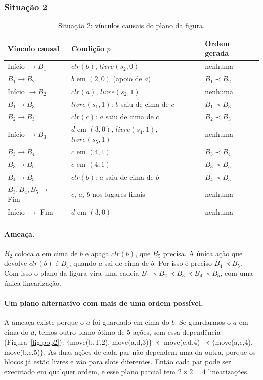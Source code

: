 \documentclass[11pt,a4paper]{article}
\newcommand{\clr}{\mathit{clr}}
\newcommand{\livre}{\mathit{livre}}
\begin{document}
\subsubsection{Situação 2}
\begin{table}[H]
\centering\small
\begin{tabular}{@{}lll@{}}
\toprule
Vínculo causal & Condição $p$ & Ordem gerada\\
\midrule
Início $\to B_1$ & $\clr(b)$, $\livre(s_2,0)$ & nenhuma\\
$B_1 \to B_2$ & $b$ em $(2,0)$ (apoio de $a$) & $B_1\prec B_2$\\
Início $\to B_2$ & $\clr(a)$, $\livre(s_2,1)$ & nenhuma\\
$B_1 \to B_3$ & $\livre(s_1,1)$: $b$ saiu de cima de $c$ & $B_1\prec B_3$\\
$B_2 \to B_3$ & $\clr(c)$: $a$ saiu de cima de $c$ & $B_2\prec B_3$\\
Início $\to B_3$ & $d$ em $(3,0)$, $\livre(s_4,1)$, $\livre(s_5,1)$ & nenhuma\\
$B_3 \to B_4$ & $c$ em $(4,1)$ & $B_3\prec B_4$\\
$B_3 \to B_5$ & $c$ em $(4,1)$ & $B_3\prec B_5$\\
$B_4 \to B_5$ & $\clr(b)$: $a$ saiu de cima de $b$ & $B_4\prec B_5$\\
$B_3, B_4, B_5 \to$ Fim & $c$, $a$, $b$ nos lugares finais & nenhuma\\
Início $\to$ Fim & $d$ em $(3,0)$ & nenhuma\\
\bottomrule
\end{tabular}
\caption{Situação 2: vínculos causais do plano da figura.}
\label{tab:pop2}
\end{table}

\paragraph{Ameaça.} $B_2$ coloca $a$ em cima de $b$ e apaga $\clr(b)$, que $B_5$
precisa. A única ação que devolve $\clr(b)$ é $B_4$, quando $a$ sai de cima de $b$.
Por isso é preciso $B_4\prec B_5$. Com isso o plano da figura vira uma cadeia
$B_1\prec B_2\prec B_3\prec B_4\prec B_5$, com uma única linearização.

\paragraph{Um plano alternativo com mais de uma ordem possível.} A ameaça existe
porque o $a$ foi guardado em cima do $b$. Se guardarmos o $a$ em cima do $d$, temos
outro plano ótimo de 5 ações, sem essa dependência (Figura~\ref{fig:pop2}):
$\{$move(b,T,2), move(a,d,3)$\}\prec$ move(c,d,4) $\prec\{$move(a,c,4), move(b,c,5)$\}$.
As duas ações de cada par não dependem uma da outra, porque os blocos já estão
livres e vão para slots diferentes. Então cada par pode ser executado em qualquer
ordem, e esse plano parcial tem $2\times 2=4$ linearizações.
\end{document}
